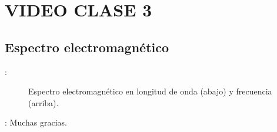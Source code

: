 \section{VIDEO CLASE 3}
\subsection{Espectro electromagnético}
\begin{frame}{\secname : \subsecname}
  \begin{figure}
    \centering
    \caption{Espectro electromagnético en longitud de onda (abajo) y frecuencia (arriba).}
    \label{}
  \end{figure}
\end{frame}


\begin{frame}{\secname : \subsecname}
Muchas gracias.
\end{frame}
